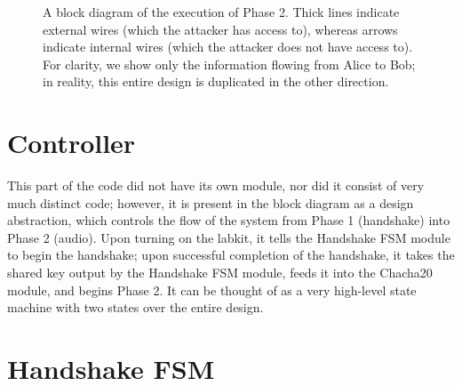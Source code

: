 \documentclass[a4paper]{report}
\begin{document}
\begin{figure}
\label{fig3}
\centering \caption{A block diagram of the execution of Phase 2. Thick lines indicate external wires (which the attacker has access to), whereas arrows indicate internal wires (which the attacker does not have access to). For clarity, we show only the information flowing from Alice to Bob; in reality, this entire design is duplicated in the other direction.}
%
\end{figure}

\section{Controller}

This part of the code did not have its own module, nor did it consist of very much distinct code; however, it is present in the block diagram as a design abstraction, which controls the flow of the system from Phase 1 (handshake) into Phase 2 (audio). Upon turning on the labkit, it tells the Handshake FSM module to begin the handshake; upon successful completion of the handshake, it takes the shared key output by the Handshake FSM module, feeds it into the Chacha20 module, and begins Phase 2. It can be thought of as a very high-level state machine with two states over the entire design.

\section{Handshake FSM}
\end{document}
